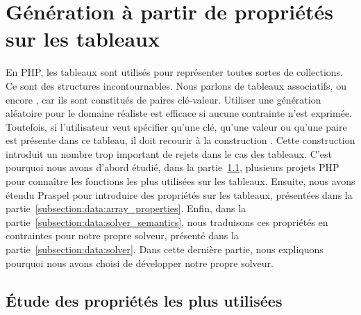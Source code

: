 \section{Génération à partir de propriétés sur les tableaux}
\label{section:data:arrays}

En PHP, les tableaux sont utilisés pour représenter toutes sortes de
collections. Ce sont des structures incontournables. Nous parlons de tableaux
associatifs, ou encore , car ils sont constitués de paires
clé-valeur. Utiliser une génération aléatoire pour le domaine réaliste
 est efficace si aucune contrainte n'est exprimée. Toutefois, si
l'utilisateur veut spécifier qu'une clé, qu'une valeur ou qu'une paire est
présente dans ce tableau, il doit recourir à la construction \apred{\empty}.
Cette construction introduit un nombre trop important de rejets dans le cas des
tableaux. C'est pourquoi nous avons d'abord étudié, dans la
partie~\ref{subsection:data:study}, plusieurs projets PHP pour connaître les
fonctions les plus utilisées sur les tableaux. Ensuite, nous avons étendu
Praspel pour introduire des propriétés sur les tableaux, présentées dans la
partie~\ref{subsection:data:array_properties}.  Enfin, dans la
partie~\ref{subsection:data:solver_semantics}, nous traduisons ces propriétés en
contraintes pour notre propre solveur, présenté dans la
partie~\ref{subsection:data:solver}. Dans cette dernière partie, nous expliquons
pourquoi nous avons choisi de développer notre propre solveur.

\subsection{Étude des propriétés les plus utilisées}
\label{subsection:data:study}

